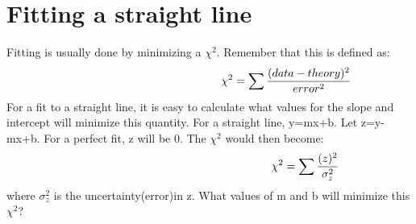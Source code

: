 \section{Fitting a straight line}
Fitting is usually done by minimizing a $\chi^{2}$. Remember that this is defined as: 
\begin{equation}\hspace{48 mm}
\chi^2=\sum \frac{(data-theory)^{2}}{error^{2}}
\end{equation}
For a fit to a straight line, it is easy to calculate what values for the slope and intercept will minimize this quantity. For a straight line, y=mx+b. Let z=y-mx+b. For a perfect fit, z will be 0. The $\chi^{2}$ would then become: 
\begin{equation}\hspace{60 mm}
\chi^2=\sum \frac{(z)^{2}}{\sigma_{z}^{2}}
\end{equation}
where $\sigma_{z}^{2}$ is the uncertainty(error)in z. What values of m and b will minimize this $\chi^{2}$? 

